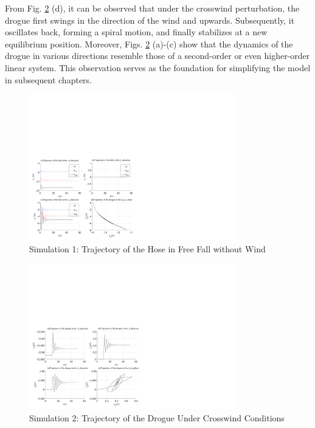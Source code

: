 From Fig. \ref{fig4.9} (d), it can be observed that under the crosswind perturbation, the drogue first swings in the direction of the wind and upwards. Subsequently, it oscillates back, forming a spiral motion, and finally stabilizes at a new equilibrium position. Moreover, Figs. \ref{fig4.9} (a)-(c) show that the dynamics of the drogue in various directions resemble those of a second-order or even higher-order linear system. This observation serves as the foundation for simplifying the model in subsequent chapters.
\begin{figure}[th]
	\centering
	\includegraphics[width=0.8\textwidth]{Figures/Figs_Ch3/fig8.pdf}
	\caption{Simulation 1: Trajectory of the Hose in Free Fall without Wind}\label{fig4.8}
\end{figure}
\begin{figure}[th]
	\centering
	\includegraphics[width=0.8\textwidth]{Figures/Figs_Ch3/fig9.pdf}
	\caption{Simulation 2: Trajectory of the Drogue Under Crosswind Conditions}\label{fig4.9}
\end{figure}

